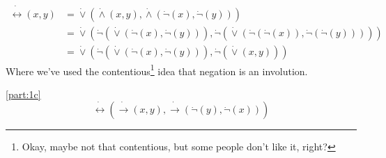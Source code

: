 \documentclass[boxes,pages,color=CornflowerBlue]{homework}
\begin{document}
\begin{solution}
    \begin{align*}
        \dot{\leftrightarrow}(x, y) & = \dot{\vee}(\dot{\wedge}(x, y), \dot{\wedge}(\dot{\neg}(x), \dot{\neg}(y)))                                                                     \\
                                    & = \dot{\vee}(\dot{\neg}(\dot{\vee}(\dot{\neg}(x), \dot{\neg}(y))), \dot{\neg}(\dot{\vee}(\dot{\neg}(\dot{\neg}(x)), \dot{\neg}(\dot{\neg}(y))))) \\
                                    & = \dot{\vee}(\dot{\neg}(\dot{\vee}(\dot{\neg}(x), \dot{\neg}(y))), \dot{\neg}(\dot{\vee}(x, y)))
    \end{align*}
    Where we've used the contentious\footnote{Okay, maybe not that contentious, but some people don't like it, right?} idea that negation is an involution.

    \ref{part:1c}
    \begin{equation*}
        \dot{\leftrightarrow}(\dot{\rightarrow}(x, y), \dot{\rightarrow}(\dot{\neg}(y), \dot{\neg}(x)))
    \end{equation*}
\end{solution}
\end{document}
